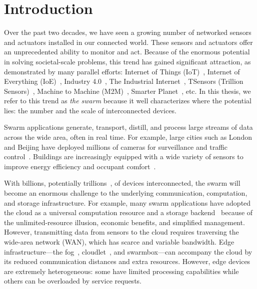 \documentclass[thesis.tex]{subfiles}
\begin{document}
\chapter{Introduction}

Over the past two decades, we have seen a growing number of networked sensors
and actuators installed in our connected world. These sensors and actuators
offer an unprecedented ability to monitor and act. Because of the enormous
potential in solving societal-scale problems, this trend has gained significant
attraction, as demonstrated by many parallel efforts: Internet of Things
(IoT)~\cite{atzori2010internet}, Internet of Everything
(IoE)~\cite{bradley2013internet}, Industry 4.0~\cite{lasi2014industry}, The
Industrial Internet~\cite{eigner2018industrial}, TSensors (Trillion
Sensors)~\cite{bogue2014towards}, Machine to Machine
(M2M)~\cite{anton2014machine}, Smarter Planet~\cite{palmisano2008smarter},
etc. In this thesis, we refer to this trend as \textit{the swarm} because it
well characterizes where the potential lies: the number and the scale of
interconnected devices.

Swarm applications generate, transport, distill, and process large streams of
data across the wide area, often in real time. For example, large cities such as
London and Beijing have deployed millions of cameras for surveillance and
traffic control~\cite{skynet, london.surveillance}. Buildings are increasingly
equipped with a wide variety of sensors to improve energy efficiency and
occupant comfort~\cite{dawson2010smap, krioukov2012building}.

With billions, potentially trillions~\cite{middleton2013forecast}, of devices
interconnected, the swarm will become an enormous challenge to the underlying
communication, computation, and storage infrastructure. For example, many swarm
applications have adopted the cloud as a universal computation resource and a
storage backend~\cite{carriots, sami, gupta2014bolt, zachariah1001internet}
because of the unlimited-resource illusion, economic benefits, and simplified
management. However, transmitting data from sensors to the cloud requires
traversing the wide-area network (WAN), which has scarce and variable
bandwidth. Edge infrastructure---the fog~\cite{bonomi2012fog, bar2013fog},
cloudlet~\cite{ha2014towards, satyanarayanan2009case, chen2018application}, and
swarmbox---can accompany the cloud by its reduced communication distances and
extra resources. However, edge devices are extremely heterogeneous: some have
limited processing capabilities while others can be overloaded by service
requests.
\end{document}
